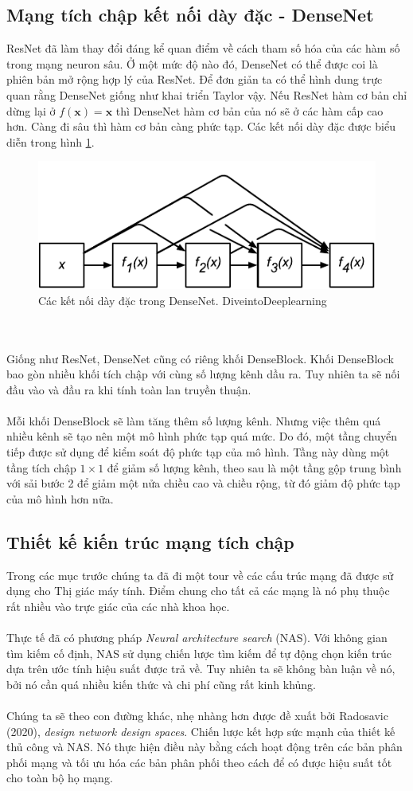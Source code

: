 \documentclass{article}
\begin{document}
\subsection{Mạng tích chập kết nối dày đặc - DenseNet}
ResNet đã làm thay đổi đáng kể quan điểm về cách tham số hóa của các hàm số trong mạng neuron sâu. Ở một mức độ nào đó, DenseNet có thể được coi là phiên bản mở rộng hợp lý của ResNet. Để đơn giản ta có thể hình dung trực quan rằng DenseNet giống như khai triển Taylor vậy. Nếu ResNet hàm cơ bản chỉ dừng lại ở $f(\textbf{x}) = \textbf{x}$ thì DenseNet hàm cơ bản của nó sẽ ở các hàm cấp cao hơn. Càng đi sâu thì hàm cơ bản càng phức tạp. Các kết nối dày đặc được biểu diễn trong hình \ref{fig19}.
\begin{figure}
    \centering
    \includegraphics[width = 0.6\linewidth]{densenet.pdf}
    \caption{Các kết nối dày đặc trong DenseNet. DiveintoDeeplearning}
    \label{fig19}
\end{figure}
\phantom{a}\\\\
Giống như ResNet, DenseNet cũng có riêng khối DenseBlock. Khối DenseBlock bao gòn nhiều khối tích chập với cùng số lượng kênh dầu ra. Tuy nhiên ta sẽ nối đầu vào và đầu ra khi tính toàn lan truyền thuận.\\\\
Mỗi khối DenseBlock sẽ làm tăng thêm số lượng kênh. Nhưng việc thêm quá nhiều kênh sẽ tạo nên một mô hình phức tạp quá mức. Do đó, một tầng chuyển tiếp được sử dụng để kiểm soát độ phức tạp của mô hình. Tầng này dùng một tầng tích chập $1\times1$ để giảm số lượng kênh, theo sau là một tầng gộp trung bình với sải bước 2 để giảm một nửa chiều cao và chiều rộng, từ đó giảm độ phức tạp của mô hình hơn nữa.
\subsection{Thiết kế kiến trúc mạng tích chập}
Trong các mục trước chúng ta đã đi một tour về các cấu trúc mạng đã được sử dụng cho Thị giác máy tính. Điểm chung cho tất cả các mạng là nó phụ thuộc rất nhiều vào trực giác của các nhà khoa học.\\\\
Thực tế đã có phương pháp \textit{Neural architecture search} (NAS). Với không gian tìm kiếm cố định, NAS sử dụng chiến lược tìm kiếm để tự động chọn kiến trúc dựa trên ước tính hiệu suất được trả về. Tuy nhiên ta sẽ không bàn luận về nó, bởi nó cần quá nhiều kiến thức và chi phí cũng rất kinh khủng.\\\\
Chúng ta sẽ theo con đường khác, nhẹ nhàng hơn được đề xuất bởi Radosavic (2020), \textit{design network design spaces}. Chiến lược kết hợp sức mạnh của thiết kế thủ công và NAS. Nó thực hiện điều này bằng cách hoạt động trên các bản phân phối mạng và tối ưu hóa các bản phân phối theo cách để có được hiệu suất tốt cho toàn bộ họ mạng.
\end{document}
